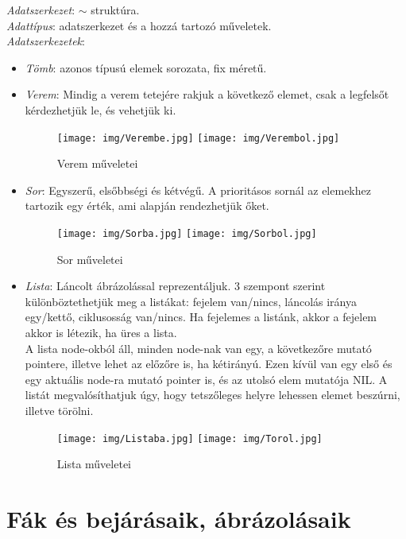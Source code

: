 \documentclass[margin=0px]{article}
\begin{document}
\textit{Adatszerkezet}: $\sim$ struktúra. \\
\textit{Adattípus}: adatszerkezet és a hozzá tartozó műveletek. \\
\textit{Adatszerkezetek}:
\begin{itemize}
    \item \textit{Tömb}: azonos típusú elemek sorozata, fix méretű.
    \item \textit{Verem}: Mindig a verem tetejére rakjuk a következő elemet, csak a legfelsőt kérdezhetjük le, és vehetjük ki.
          \begin{figure}[H]
              \centering
              \texttt{[image: img/Verembe.jpg]}
              \texttt{[image: img/Verembol.jpg]}
              \caption{Verem műveletei}
          \end{figure}
    \item \textit{Sor}: Egyszerű, elsőbbségi és kétvégű. A prioritásos sornál az elemekhez tartozik egy érték, ami alapján rendezhetjük  őket.
          \begin{figure}[H]
              \centering
              \texttt{[image: img/Sorba.jpg]}
              \texttt{[image: img/Sorbol.jpg]}
              \caption{Sor műveletei}
          \end{figure}
    \item \textit{Lista}: Láncolt ábrázolással reprezentáljuk. 3 szempont szerint különböztethetjük meg a listákat: fejelem van/nincs, láncolás iránya egy/kettő, ciklusosság van/nincs. Ha fejelemes a listánk, akkor a fejelem akkor is létezik, ha üres a lista. \\
          A lista node-okból áll, minden node-nak van egy, a következőre mutató pointere, illetve lehet az előzőre is, ha kétirányú. Ezen kívül van egy első és egy aktuális node-ra mutató pointer is, és az utolsó elem mutatója NIL. A listát megvalósíthatjuk úgy, hogy tetszőleges helyre lehessen elemet beszúrni, illetve törölni.
          \begin{figure}[H]
              \centering
              \texttt{[image: img/Listaba.jpg]}
              \texttt{[image: img/Torol.jpg]}
              \caption{Lista műveletei}
          \end{figure}
\end{itemize}

\section{Fák és bejárásaik, ábrázolásaik}
\end{document}
